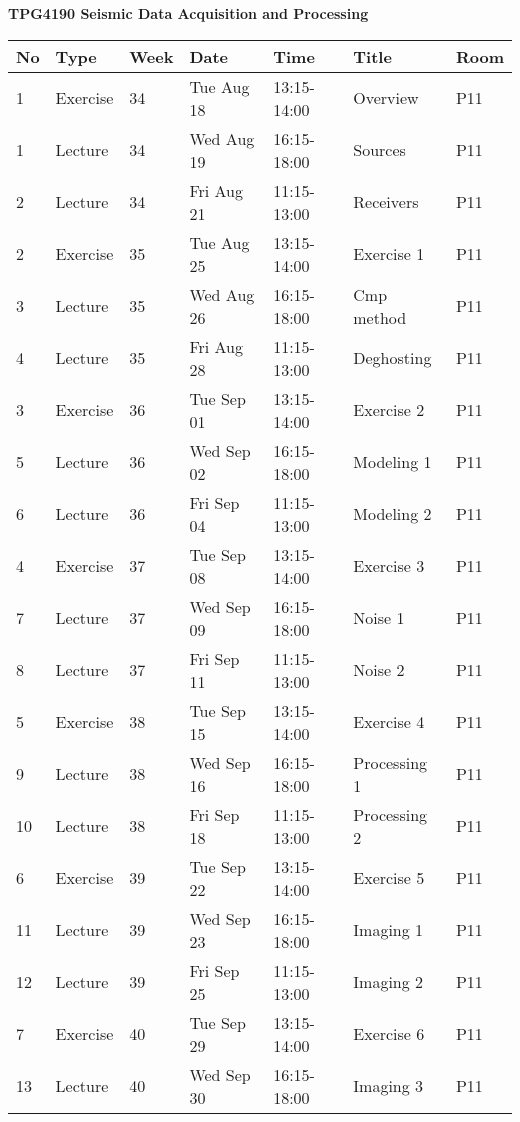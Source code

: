 \documentclass{article}
\begin{document}
\begin{center} \large{\bf{TPG4190 Seismic Data Acquisition and Processing}} \end{center}
\begin{tabular}{|l|l|l|l|l|l|l|} \hline
\bf{No}  &  \bf{Type}  &  \bf{Week}  &  \bf{Date}  &  \bf{Time}  &  \bf{Title}  &  \bf{Room} \\ \hline
1 & Exercise & 34 & Tue Aug 18 & 13:15-14:00 & Overview & P11\\ \hline
1 & Lecture & 34 & Wed Aug 19 & 16:15-18:00 & Sources & P11\\ \hline
2 & Lecture & 34 & Fri Aug 21 & 11:15-13:00 & Receivers & P11\\ \hline
2 & Exercise & 35 & Tue Aug 25 & 13:15-14:00 & Exercise 1 & P11\\ \hline
3 & Lecture & 35 & Wed Aug 26 & 16:15-18:00 & Cmp method & P11\\ \hline
4 & Lecture & 35 & Fri Aug 28 & 11:15-13:00 & Deghosting & P11\\ \hline
3 & Exercise & 36 & Tue Sep 01 & 13:15-14:00 & Exercise 2 & P11\\ \hline
5 & Lecture & 36 & Wed Sep 02 & 16:15-18:00 & Modeling 1 & P11\\ \hline
6 & Lecture & 36 & Fri Sep 04 & 11:15-13:00 & Modeling 2 & P11\\ \hline
4 & Exercise & 37 & Tue Sep 08 & 13:15-14:00 & Exercise 3 & P11\\ \hline
7 & Lecture & 37 & Wed Sep 09 & 16:15-18:00 & Noise 1 & P11\\ \hline
8 & Lecture & 37 & Fri Sep 11 & 11:15-13:00 & Noise 2 & P11\\ \hline
5 & Exercise & 38 & Tue Sep 15 & 13:15-14:00 & Exercise 4 & P11\\ \hline
9 & Lecture & 38 & Wed Sep 16 & 16:15-18:00 & Processing 1 & P11\\ \hline
10 & Lecture & 38 & Fri Sep 18 & 11:15-13:00 & Processing 2 & P11\\ \hline
6 & Exercise & 39 & Tue Sep 22 & 13:15-14:00 & Exercise 5 & P11\\ \hline
11 & Lecture & 39 & Wed Sep 23 & 16:15-18:00 & Imaging 1 & P11\\ \hline
12 & Lecture & 39 & Fri Sep 25 & 11:15-13:00 & Imaging 2 & P11\\ \hline
7 & Exercise & 40 & Tue Sep 29 & 13:15-14:00 & Exercise 6 & P11\\ \hline
13 & Lecture & 40 & Wed Sep 30 & 16:15-18:00 & Imaging 3 & P11\\ \hline

\end{tabular}
\end{document}

